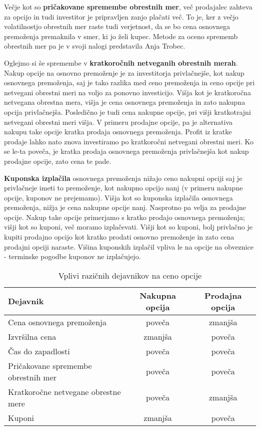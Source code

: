 \documentclass[a4paper]{article}
\begin{document}
Večje kot so \textbf{pričakovane spremembe obrestnih mer}, več prodajalec zahteva za opcijo in tudi investitor je pripravljen
zanjo plačati več. To je, ker z večjo volatilnostjo obrestnih mer raste tudi verjetnost, da se bo cena osnovnega premoženja premaknila
v smer, ki jo želi kupec. Metode za oceno sprememb obrestnih mer pa je v svoji nalogi predstavila Anja Trobec.

Oglejmo si še spremembe v \textbf{kratkoročnih netveganih obrestnih merah}. Nakup opcije na osnovno premoženje 
je za investitorja privlačnejše, kot nakup osnovnega premoženja, saj je tako razlika med ceno 
premoženja in ceno opcije pri netvegani obrestni meri na voljo za ponovno investicijo. Višja kot je kratkoročna netvegana 
obrestna mera, višja je cena osnovnega premoženja in zato nakupna opcija privlačnejša. Posledično je tudi cena nakupne opcije, pri 
višji kratkotrajni netvegani obrestni meri višja. V primeru prodajne opcije, pa je alternativa nakupu take opcije kratka prodaja
osnovnega premoženja. Profit iz kratke prodaje lahko nato znova investiramo po kratkoročni netvegani obrestni meri. Ko se le-ta poveča,
je kratka prodaja osnovnega premoženja privlačnejša kot nakup prodajne opcije, zato cena te pade.

\textbf{Kuponska izplačila} osnovnega premoženja nižajo ceno nakupni opciji saj je privlačneje imeti to premoženje, kot nakupno 
opcijo nanj (v primeru nakupne opcije, kuponov ne prejemamo). Višja kot so kuponska izplačila osnovnega premoženja, nižja je cena
nakupne opcije nanj. Nasprotno pa velja za prodajne opcije. Nakup take opcije primerjamo s kratko prodajo osnovnega premoženja;
višji kot so kuponi, več moramo izplačevati. Višji kot so kuponi, bolj privlačno je kupiti prodajno opcijo kot kratko prodati osnovno
premoženje in zato cena prodajni opciji naraste. Višina kuponskih izplačil vpliva le na opcije na obveznice - terminske pogodbe kuponov ne 
izplačujejo.

\begin{table}
    \begin{tabular}{l|c|c}
        Dejavnik & Nakupna opcija & Prodajna opcija \\
        \hline\hline
        Cena osnovnega premoženja & poveča & zmanjša \\
        Izvršilna cena & zmanjša & poveča \\
        Čas do zapadlosti & poveča & poveča \\
        Pričakovane spremembe obrestnih mer & poveča & poveča \\
        Kratkoročne netvegane obrestne mere & poveča & zmanjša \\
        Kuponi & zmanjša & poveča
    \end{tabular}
    \caption{Vplivi razičnih dejavnikov na ceno opcije}
\end{table}

\nocite{*}



\end{document}
